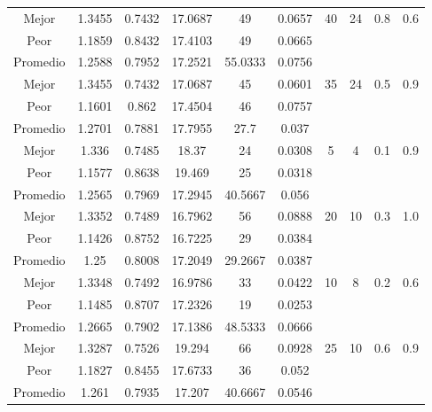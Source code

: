 \begin{table}[h!]
\begin{center}
\begin{tabular}{|c|c|c|c|c|c|c|c|c|c|}
            \cline{1-6}
            Mejor & 1.3455 & 0.7432  & 17.0687 & 49 & 0.0657 & 40 & 24 & 0.8 & 0.6\\
            \cline{1-6}
            Peor & 1.1859 & 0.8432  & 17.4103 & 49 & 0.0665 &  &  &  & \\
        \hline
        \hline
            Promedio  & 1.2588 & 0.7952 & 17.2521 & 55.0333 & 0.0756 &  &  &  & \\
            \cline{1-6}
            Mejor & 1.3455 & 0.7432  & 17.0687 & 45 & 0.0601 & 35 & 24 & 0.5 & 0.9\\
            \cline{1-6}
            Peor & 1.1601 & 0.862  & 17.4504 & 46 & 0.0757 &  &  &  & \\
        \hline
        \hline
            Promedio  & 1.2701 & 0.7881 & 17.7955 & 27.7 & 0.037 &  &  &  & \\
            \cline{1-6}
            Mejor & 1.336 & 0.7485  & 18.37 & 24 & 0.0308 & 5 & 4 & 0.1 & 0.9\\
            \cline{1-6}
            Peor & 1.1577 & 0.8638  & 19.469 & 25 & 0.0318 &  &  &  & \\
        \hline
        \hline
            Promedio  & 1.2565 & 0.7969 & 17.2945 & 40.5667 & 0.056 &  &  &  & \\
            \cline{1-6}
            Mejor & 1.3352 & 0.7489  & 16.7962 & 56 & 0.0888 & 20 & 10 & 0.3 & 1.0\\
            \cline{1-6}
            Peor & 1.1426 & 0.8752  & 16.7225 & 29 & 0.0384 &  &  &  & \\
        \hline
        \hline
            Promedio  & 1.25 & 0.8008 & 17.2049 & 29.2667 & 0.0387 &  &  &  & \\
            \cline{1-6}
            Mejor & 1.3348 & 0.7492  & 16.9786 & 33 & 0.0422 & 10 & 8 & 0.2 & 0.6\\
            \cline{1-6}
            Peor & 1.1485 & 0.8707  & 17.2326 & 19 & 0.0253 &  &  &  & \\
        \hline
        \hline
            Promedio  & 1.2665 & 0.7902 & 17.1386 & 48.5333 & 0.0666 &  &  &  & \\
            \cline{1-6}
            Mejor & 1.3287 & 0.7526  & 19.294 & 66 & 0.0928 & 25 & 10 & 0.6 & 0.9\\
            \cline{1-6}
            Peor & 1.1827 & 0.8455  & 17.6733 & 36 & 0.052 &  &  &  & \\
        \hline
        \hline
            Promedio  & 1.261 & 0.7935 & 17.207 & 40.6667 & 0.0546 &  &  &  & \\

\end{tabular}
\end{center}
\end{table}
